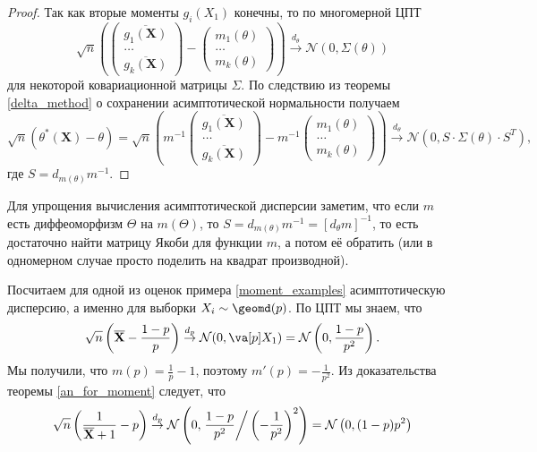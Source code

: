 \begin{proof}
    Так как вторые моменты $g_i(X_1)$ конечны, то по многомерной ЦПТ
    \[
    \sqrt{n}
    \left(
    \begin{pmatrix}
        \overline{g_1(\mathbf X)}\\
        \ldots\\
        \overline{g_k(\mathbf X)}
    \end{pmatrix}
    -
    \begin{pmatrix}
        m_1(\theta)\\
        \ldots\\
        m_k(\theta)
    \end{pmatrix}
    \right)
    \stackrel{d_{\theta}}{\longrightarrow}
    \mathcal{N}(0, \Sigma(\theta))
    \]
    для некоторой ковариационной матрицы $\Sigma$. По следствию из теоремы \ref{delta_method} о сохранении асимптотической нормальности получаем
    \[
    \sqrt{n}(\theta^*(\mathbf X) - \theta) = \sqrt{n}
    \left(
    m^{-1}
    \begin{pmatrix}
        \overline{g_1(\mathbf X)}\\
        \ldots\\
        \overline{g_k(\mathbf X)}
    \end{pmatrix}
    -
    m^{-1}\begin{pmatrix}
        m_1(\theta)\\
        \ldots\\
        m_k(\theta)
    \end{pmatrix}
    \right)
    \stackrel{d_{\theta}}{\longrightarrow}
    \mathcal{N}\left(0, S \cdot \Sigma(\theta) \cdot S^T \right),
    \]
    где $S = d_{m(\theta)}m^{-1}$.
\end{proof}

Для упрощения вычисления асимптотической дисперсии заметим, что если $m$ есть диффеоморфизм $\Theta$ на $m(\Theta)$, то $S = d_{m(\theta)}m^{-1} = [d_{\theta}m]^{-1}$, то есть достаточно найти матрицу Якоби для функции $m$, а потом её обратить (или в одномерном случае просто поделить на квадрат производной).

\begin{example}
    Посчитаем для одной из оценок примера \ref{moment_examples} асимптотическую дисперсию, а именно для выборки $X_i \sim \geomd(p)$. По ЦПТ мы знаем, что
        \[
        \sqrt{n}\left(\overline{\mathbf X} - \frac{1-p}{p}\right) \stackrel{d_{p}}{\rightarrow} \mathcal{N}(0, \va[p]X_1) = \mathcal{N}\left(0, \frac{1-p}{p^2}\right).
        \]
        Мы получили, что $m(p) = \frac{1}{p} - 1$, поэтому $m'(p) = -\frac{1}{p^2}$. Из доказательства теоремы \ref{an_for_moment} следует, что
        \[
        \sqrt{n}\left(\frac{1}{\overline{\mathbf X}+1} - p\right) \stackrel{d_{p}}{\rightarrow} \mathcal{N}\left(0,  \left. \frac{1-p}{p^2}\right/\left(-\frac{1}{p^2}\right)^2\right) = \mathcal{N}\left(0, (1-p)p^2\right)
        \]
\end{example}

